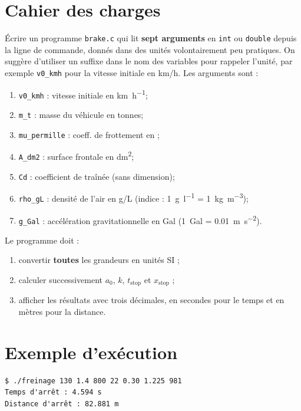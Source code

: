 \documentclass[french,a4paper,addpoints,11pt]{exam}
\begin{document}
\begin{multicols}{2}
\begin{questions}
        \section*{Cahier des charges}

        Écrire un programme \texttt{brake.c} qui lit \textbf{sept arguments} en \texttt{int} ou \texttt{double} depuis la ligne de commande, donnés dans des unités volontairement peu pratiques. On suggère d'utiliser un suffixe dans le nom des variables pour rappeler l'unité, par exemple \texttt{v0\_kmh} pour la vitesse initiale en km/h. Les arguments sont :

        \begin{enumerate}
            \item \texttt{v0\_kmh} : vitesse initiale en \si{\kilo\metre\per\hour};
            \item \texttt{m\_t} : masse du véhicule en tonnes;
            \item \texttt{mu\_permille} : coeff. de frottement en \si{\perthousand};
            \item \texttt{A\_dm2} : surface frontale en \si{\deci\metre\squared};
            \item \texttt{Cd} : coefficient de traînée (sans dimension);
            \item \texttt{rho\_gL} : densité de l'air en g/L (indice : \SI{1}{\gram\per\litre} = \SI{1}{\kilogram\per\metre\cubed});
            \item \texttt{g\_Gal} : accélération gravitationnelle en Gal (\SI{1}{Gal} = \SI{0.01}{\metre\per\second\squared}).
        \end{enumerate}

        Le programme doit :
        \begin{enumerate}
            \item convertir \textbf{toutes} les grandeurs en unités SI ;
            \item calculer successivement $a_0$, $k$, $t_{\text{stop}}$ et $x_{\text{stop}}$ ;
            \item afficher les résultats avec trois décimales, en secondes pour le temps et en mètres pour la distance.
        \end{enumerate}

        \section*{Exemple d'exécution}

        \begin{lstlisting}
$ ./freinage 130 1.4 800 22 0.30 1.225 981
Temps d'arrêt : 4.594 s
Distance d'arrêt : 82.881 m
        \end{lstlisting}


\end{questions}
\end{multicols}
\end{document}
